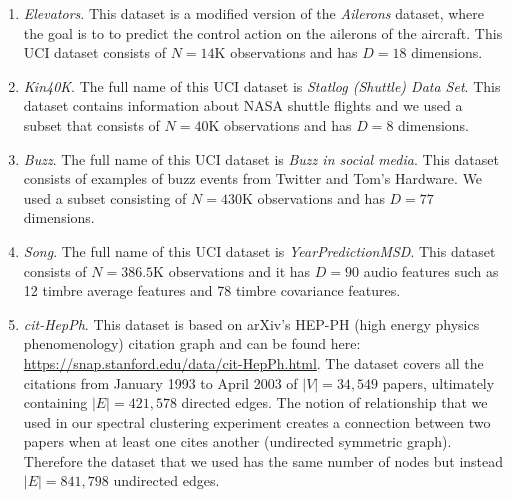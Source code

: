 \documentclass{article}
\begin{document}
\begin{enumerate}
    \item \emph{Elevators}.
    This dataset is a modified version of the \emph{Ailerons} dataset,
    where the goal is to to predict the control action on the ailerons of the aircraft.
    This UCI dataset consists of $N=14$K observations and
    has $D=18$ dimensions.

    \item \emph{Kin40K}.
    The full name of this UCI dataset is
    \emph{Statlog (Shuttle) Data Set}.
    This dataset contains information about NASA shuttle flights and we used a subset that consists of $N=40$K observations and has $D=8$ dimensions.

    \item \emph{Buzz}.
    The full name of this UCI dataset is
    \emph{Buzz in social media}.
    This dataset consists of examples of buzz events from Twitter and Tom's Hardware. We used a subset consisting of $N=430$K observations and
    has $D=77$ dimensions.

    \item \emph{Song}.
    The full name of this UCI dataset is
    \emph{YearPredictionMSD}.
    This dataset consists of $N=386.5$K observations and
    it has $D=90$ audio features such as
    12 timbre average features and 78 timbre covariance features.

    \item \emph{cit-HepPh}.
    This dataset is based on arXiv's HEP-PH (high energy physics phenomenology)
    citation graph and can be found here:
    \url{https://snap.stanford.edu/data/cit-HepPh.html}.
    The dataset covers all the citations from January 1993 to April 2003
    of $|V|=34,549$ papers, ultimately containing $|E|=421,578$ directed edges.
    The notion of relationship that we used in our spectral clustering experiment
    creates a connection between two papers when at least one cites another (undirected symmetric graph).
    Therefore the dataset that we used has the same number of nodes
    but instead $|E|=841,798$ undirected edges.
\end{enumerate}
\end{document}
